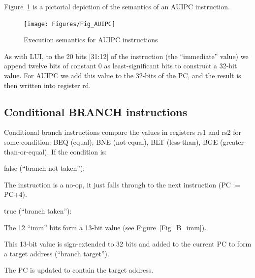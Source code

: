 Figure~\ref{Fig_AUIPC} is a pictorial depiction of the semantics of an AUIPC instruction.
\begin{figure}[htbp]
  \centerline{\texttt{[image: Figures/Fig\_AUIPC]}}
  \caption{\label{Fig_AUIPC} Execution semantics for AUIPC instructions}
\end{figure}
As with LUI, to the 20 bits [31:12] of the instruction (the
``immediate'' value) we append twelve bits of constant 0 as
least-significant bits to construct a 32-bit value.  For AUIPC we add
this value to the 32-bits of the PC, and the result is then written
into register rd.


\subsection{Conditional BRANCH instructions}

Conditional branch instructions compare the values in registers rs1
and rs2 for some condition: BEQ (equal), BNE (not-equal), BLT
(less-than), BGE (greater-than-or-equal).  If the condition is:

\begin{tightlist}

  \item false (``branch not taken''):

    \begin{tightlist}
      \item The instruction is a no-op, it just falls through to the
            next instruction (PC := PC+4).
    \end{tightlist}

  \item true (``branch taken''):

    \begin{tightlist}
      \item The 12 ``imm'' bits form a 13-bit value (see
            Figure~\ref{Fig_B_imm}).

      \item This 13-bit value is sign-extended to 32 bits and added to
            the current PC to form a target address (``branch
            target'').
            
      \item The PC is updated to contain the target address.
    \end{tightlist}

\end{tightlist}

